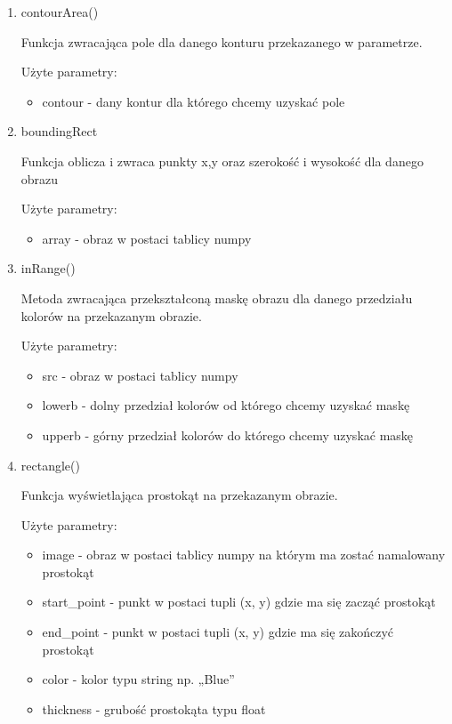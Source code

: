 \documentclass{article}
\begin{document}
\begin{enumerate}
\item contourArea() \cite{opencv9}

Funkcja zwracająca pole dla danego konturu przekazanego w parametrze.

Użyte parametry:

\begin{itemize}
\item contour - dany kontur dla którego chcemy uzyskać pole
\end{itemize}

\item boundingRect \cite{opencv10}

Funkcja oblicza i zwraca punkty x,y oraz szerokość i wysokość dla danego obrazu

Użyte parametry:

\begin{itemize}
\item array - obraz w postaci tablicy numpy
\end{itemize}

\item inRange() \cite{opencv11}

Metoda zwracająca przekształconą maskę obrazu dla danego przedziału kolorów na przekazanym obrazie.

Użyte parametry:

\begin{itemize}
\item src - obraz w postaci tablicy numpy
\item lowerb - dolny przedział kolorów od którego chcemy uzyskać maskę
\item upperb - górny przedział kolorów do którego chcemy uzyskać maskę
\end{itemize}

\item rectangle() \cite{opencv12}

Funkcja wyświetlająca prostokąt na przekazanym obrazie.

Użyte parametry:

\begin{itemize}
\item image - obraz w postaci tablicy numpy na którym ma zostać namalowany prostokąt
\item start\_point - punkt w postaci tupli (x, y) gdzie ma się zacząć prostokąt
\item end\_point - punkt w postaci tupli (x, y) gdzie ma się zakończyć prostokąt
\item color - kolor typu string np. „Blue”
\item thickness - grubość prostokąta typu float
\end{itemize}


\end{enumerate}
\end{document}
